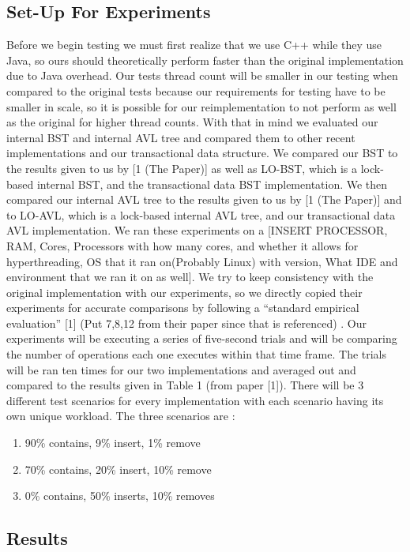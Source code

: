 \documentclass[conference]{IEEEtran}
\begin{document}
\subsection{Set-Up For Experiments}
Before we begin testing we must first realize that we use C++ while they use Java, so ours should theoretically perform faster than the original implementation due to Java overhead. Our tests thread count will be smaller in our testing when compared to the original tests because our requirements for testing have to be smaller in scale, so it is possible for our reimplementation to not perform as well as the original for higher thread counts. With that in mind we evaluated our internal BST and internal AVL tree and compared them to other recent implementations and our transactional data structure. We compared our BST to the results given to us by [1 (The Paper)] as well as LO-BST, which is a lock-based internal BST, and the transactional data BST implementation. We then compared our internal AVL tree to the results given to us by [1 (The Paper)] and to LO-AVL, which is a lock-based internal AVL tree, and our transactional data AVL implementation. 
We ran these experiments on a [INSERT PROCESSOR, RAM, Cores, Processors with how many cores, and whether it allows for hyperthreading, OS that it ran on(Probably Linux) with version, What IDE and environment that we ran it on as well].
We try to keep consistency with the original implementation with our experiments, so we directly copied their experiments for accurate comparisons by following a “standard empirical evaluation” [1] (Put 7,8,12 from their paper since that is referenced) . Our experiments will be executing a series of five-second trials and will be comparing the number of operations each one executes within that time frame. The trials will be ran ten times for our two implementations and averaged out and compared to the results given in Table 1 (from paper [1]). There will be 3 different test scenarios for every implementation with each scenario having its own unique workload. The three scenarios are : 
\begin{enumerate}[label=(\roman*)]
	\item 90\% contains, 9\% insert, 1\% remove
	\item 70\% contains, 20\% insert, 10\% remove
	\item 0\% contains, 50\% inserts, 10\% removes
\end{enumerate}

\subsection{Results}
\end{document}
